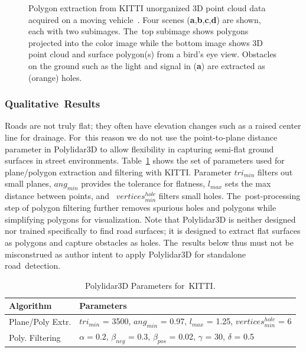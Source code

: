 \begin{figure}[ht]
  \caption{Polygon extraction from KITTI unorganized 3D point cloud data acquired on a moving vehicle~\cite{geiger_vision_2013}. Four scenes %
   (\textbf{a},\textbf{b},\textbf{c},\textbf{d}) are shown, each with two subimages. The~top subimage shows polygons projected into the color image while the bottom image shows 3D point cloud and surface polygon(s) from a bird's eye view. Obstacles on the ground such as the light and signal in (\textbf{a}) are extracted as (orange) holes. }\label{fig:ch3_kitti}
\end{figure}


\subsubsection{Qualitative~Results}\label{sec:ch3_results_kitti_qual}

Roads are not truly flat; they often have elevation changes such as a raised center line for drainage. For~this reason we do not use the point-to-plane distance parameter in Polylidar3D to allow flexibility in capturing semi-flat ground surfaces in street environments. Table~\ref{table:kitti_parameters} shows the set of parameters used for plane/polygon extraction and filtering with KITTI. Parameter $tri_{min}$ filters out small planes, $ang_{min}$ provides the tolerance for flatness, $l_{max}$ sets the max distance between points, and~ $vertices^{hole}_{min}$ filters small holes. The~post-processing step of polygon filtering further removes spurious holes and polygons while simplifying polygons for visualization. Note that Polylidar3D is neither designed nor trained specifically to find road surfaces; it is designed to extract flat surfaces as polygons and capture obstacles as holes. The~results below thus must not be misconstrued as author intent to apply Polylidar3D for standalone road~detection. 

\begin{table}[H]
\centering
\caption{Polylidar3D Parameters for~KITTI.}\label{table:kitti_parameters}
\begin{tabular}{@{}ll@{}}
\toprule
\textbf{Algorithm}        & \textbf{Parameters}                                                          \\ \midrule
Plane/Poly Extr.      & $tri_{min}$ = 3500, $ang_{min}$ = 0.97, $l_{max}$ = 1.25, $vertices^{hole}_{min}$ = 6      \\
Poly. Filtering      & $\alpha = 0.2$, $\beta_{neg}$ = 0.3, $\beta_{pos}$ = 0.02, $\gamma$ = 30, $\delta$ = 0.5      \\ \bottomrule
\end{tabular}
\end{table}


